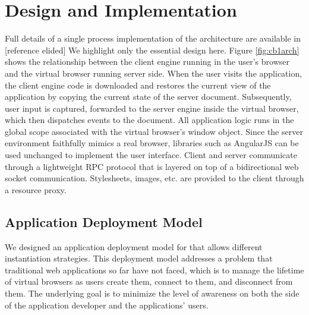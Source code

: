 \section{Design and Implementation}
\label{sec:implementation}

Full details of a single process implementation of the \cb architecture
are available in [reference elided]%
We highlight only the
essential design here.  Figure \ref{fig:cb1arch} shows the relationship 
between the client engine running in the user's browser and the virtual browser
running server side.  When the user visits the application, the client engine
code is downloaded and restores the current view of the application by
copying the current state of the server document.  Subsequently, user input 
is captured, forwarded to the server engine inside the virtual browser, 
which then dispatches events to the document.  All application logic runs
in the global scope associated with the virtual browser's window object.
Since the server environment faithfully mimics a real browser, libraries
such as AngularJS can be used unchanged to implement the user interface.
Client and server communicate through a lightweight RPC protocol that is 
layered on top of a bidirectional web socket communication. 
Stylesheets, images, etc. are provided to the client through a resource
proxy.

\subsection{Application Deployment Model}
\label{sec:appmodel}

We designed an application deployment model for \cbtwo{} that allows different
instantiation strategies.  This deployment model addresses a problem that traditional
web applications so far have not faced, which is to manage the lifetime of virtual
browsers as users create them, connect to them, and disconnect from them.
The underlying goal is to minimize the level of awareness on both the side
of the application developer and the applications' users.

